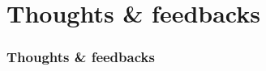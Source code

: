 \documentclass{beamer}
\begin{document}

\section{Thoughts \& feedbacks}
\begin{frame}
    \frametitle{Thoughts \& feedbacks}
    
\end{frame}
\end{document}
